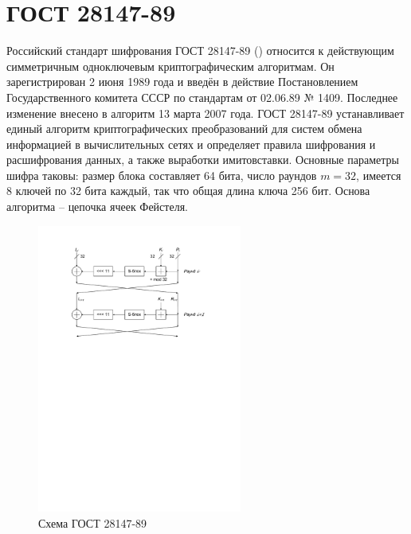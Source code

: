 \section{ГОСТ 28147-89}

Российский стандарт шифрования ГОСТ 28147-89 (\cite{GOST-89}) относится к действующим симметричным одноключевым криптографическим алгоритмам. Он зарегистрирован 2 июня 1989 года и введён в действие Постановлением Государственного комитета СССР по стандартам от 02.06.89 № 1409.
Последнее изменение внесено в алгоритм 13 марта 2007 года.
ГОСТ 28147-89 устанавливает единый алгоритм криптографических преобразований для систем обмена информацией в вычислительных сетях и определяет правила шифрования и расшифрования данных, а также выработки имитовставки. Основные параметры шифра таковы: размер блока составляет 64 бита, число раундов $m=32$, имеется 8 ключей по 32 бита каждый, так что общая длина ключа 256 бит. Основа алгоритма -- цепочка ячеек Фейстеля.

\begin{figure}[!ht]
    \centering
    \includegraphics[width=0.6\textwidth]{pic/gost-28147-89}
    \caption{Схема ГОСТ 28147-89\label{fig:gost-28147-89}}
\end{figure}

